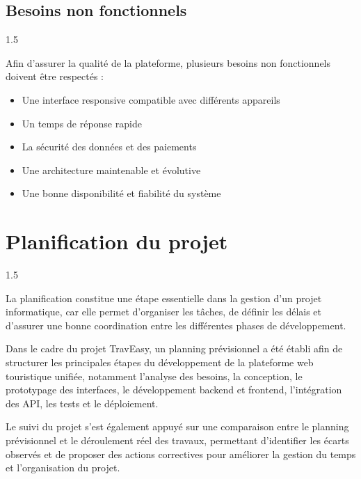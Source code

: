 \documentclass[a4paper,12pt]{report}
\begin{document}
\subsection{Besoins non fonctionnels}
\vspace{0.5cm}
\begin{spacing}{1.5}
\justifying

Afin d'assurer la qualité de la plateforme, plusieurs besoins non fonctionnels doivent
être respectés :
\begin{itemize}
    \item Une interface responsive compatible avec différents appareils 
    \item Un temps de réponse rapide 
    \item La sécurité des données et des paiements 
    \item Une architecture maintenable et évolutive 
    \item Une bonne disponibilité et fiabilité du système
\end{itemize}

\end{spacing}
\section{Planification du projet}
\vspace{0.5cm}
\begin{spacing}{1.5}
\justifying

La planification constitue une étape essentielle dans la gestion d'un projet informatique, car elle permet d'organiser les tâches, de définir les délais et d'assurer une bonne coordination entre les différentes phases de développement.

Dans le cadre du projet TravEasy, un planning prévisionnel a été établi afin de structurer les principales étapes du développement de la plateforme web touristique unifiée, notamment l'analyse des besoins, la conception, le prototypage des interfaces, le développement backend et frontend, l'intégration des API, les tests et le déploiement.

Le suivi du projet s'est également appuyé sur une comparaison entre le planning prévisionnel et le déroulement réel des travaux, permettant d'identifier les écarts observés et de proposer des actions correctives pour améliorer la gestion du temps et l'organisation du projet.


\end{spacing}
\end{document}

